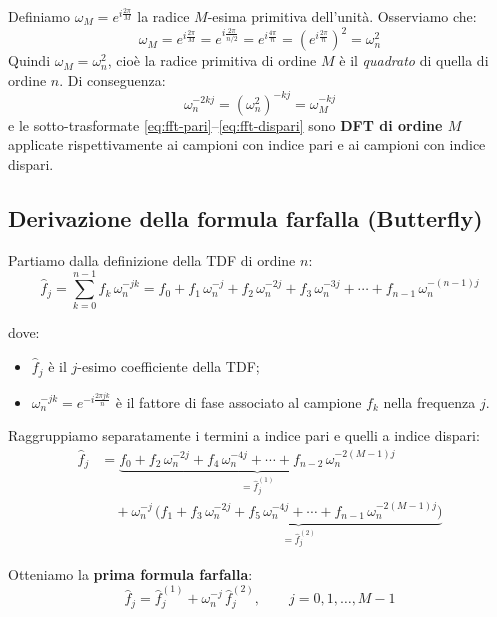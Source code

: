 \documentclass[a4paper,12pt]{article}
\theoremstyle{definition}
\theoremstyle{remark}
\begin{document}
Definiamo $\omega_M = e^{i\frac{2\pi}{M}}$ la radice $M$-esima
primitiva dell'unità. Osserviamo che:
\begin{equation}
  \omega_M
  = e^{i\frac{2\pi}{M}}
  = e^{i\frac{2\pi}{n/2}}
  = e^{i\frac{4\pi}{n}}
  = \left(e^{i\frac{2\pi}{n}}\right)^2
  = \omega_n^2
  \label{eq:omegaM-omegan}
\end{equation}
Quindi $\omega_M = \omega_n^2$, cioè la radice primitiva di ordine $M$
è il \emph{quadrato} di quella di ordine $n$. Di conseguenza:
\[
  \omega_n^{-2kj} = (\omega_n^2)^{-kj} = \omega_M^{-kj}
\]
e le sotto-trasformate \eqref{eq:fft-pari}--\eqref{eq:fft-dispari}
sono \textbf{DFT di ordine $M$} applicate rispettivamente ai campioni
con indice pari e ai campioni con indice dispari.

\subsection{Derivazione della formula farfalla (Butterfly)}

Partiamo dalla definizione della TDF di ordine $n$:
\begin{equation}
  \hat{f}_j
  = \sum_{k=0}^{n-1} f_k\,\omega_n^{-jk}
  = f_0 + f_1\,\omega_n^{-j} + f_2\,\omega_n^{-2j}
    + f_3\,\omega_n^{-3j} + \cdots + f_{n-1}\,\omega_n^{-(n-1)j}
  \label{eq:tdf-def-fft}
\end{equation}

\noindent dove:
\begin{itemize}
  \item $\hat{f}_j$ è il $j$-esimo coefficiente della TDF;
  \item $\omega_n^{-jk} = e^{-i\frac{2\pi jk}{n}}$ è il fattore
        di fase associato al campione $f_k$ nella frequenza $j$.
\end{itemize}

Raggruppiamo separatamente i termini a indice pari e quelli a indice
dispari:
\begin{align*}
  \hat{f}_j
  &= \underbrace{f_0 + f_2\,\omega_n^{-2j}
     + f_4\,\omega_n^{-4j} + \cdots + f_{n-2}\,\omega_n^{-2(M-1)j}}
     _{\displaystyle = \hat{f}_j^{(1)}} \\
  &\quad + \omega_n^{-j}\,
    \underbrace{\bigl(f_1 + f_3\,\omega_n^{-2j}
     + f_5\,\omega_n^{-4j} + \cdots + f_{n-1}\,\omega_n^{-2(M-1)j}\bigr)}
     _{\displaystyle = \hat{f}_j^{(2)}}
\end{align*}

Otteniamo la \textbf{prima formula farfalla}:
\begin{equation}
  \boxed{
    \hat{f}_j = \hat{f}_j^{(1)} + \omega_n^{-j}\,\hat{f}_j^{(2)},
    \qquad j = 0, 1, \ldots, M-1
  }
  \label{eq:butterfly-plus}
\end{equation}
\end{document}
